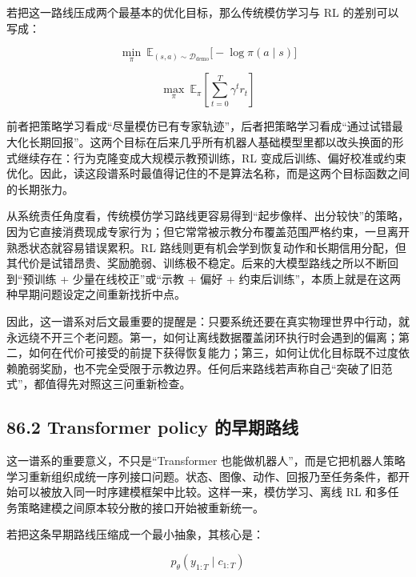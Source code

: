 若把这一路线压成两个最基本的优化目标，那么传统模仿学习与 RL 的差别可以写成：

\begingroup
\footnotesize
\begin{equation*}
\min_{\pi}\ \mathbb{E}_{(s,a)\sim \mathcal{D}_{\text{demo}}}\big[-\log \pi(a\mid s)\big]
\end{equation*}
\endgroup

\begingroup
\footnotesize
\begin{equation*}
\max_{\pi}\ \mathbb{E}_{\pi}\!\left[\sum_{t=0}^{T}\gamma^t r_t\right]
\end{equation*}
\endgroup

前者把策略学习看成“尽量模仿已有专家轨迹”，后者把策略学习看成“通过试错最大化长期回报”。这两个目标在后来几乎所有机器人基础模型里都以改头换面的形式继续存在：行为克隆变成大规模示教预训练，RL 变成后训练、偏好校准或约束优化。因此，读这段谱系时最值得记住的不是算法名称，而是这两个目标函数之间的长期张力。

从系统责任角度看，传统模仿学习路线更容易得到“起步像样、出分较快”的策略，因为它直接消费现成专家行为；但它常常被示教分布覆盖范围严格约束，一旦离开熟悉状态就容易错误累积。RL 路线则更有机会学到恢复动作和长期信用分配，但其代价是试错昂贵、奖励脆弱、训练极不稳定。后来的大模型路线之所以不断回到“预训练 + 少量在线校正”或“示教 + 偏好 + 约束后训练”，本质上就是在这两种早期问题设定之间重新找折中点。

因此，这一谱系对后文最重要的提醒是：只要系统还要在真实物理世界中行动，就永远绕不开三个老问题。第一，如何让离线数据覆盖闭环执行时会遇到的偏离；第二，如何在代价可接受的前提下获得恢复能力；第三，如何让优化目标既不过度依赖脆弱奖励，也不完全受限于示教边界。任何后来路线若声称自己“突破了旧范式”，都值得先对照这三问重新检查。

\subsection*{86.2 Transformer policy 的早期路线}


这一谱系的重要意义，不只是“Transformer 也能做机器人”，而是它把机器人策略学习重新组织成统一序列接口问题。状态、图像、动作、回报乃至任务条件，都开始可以被放入同一时序建模框架中比较。这样一来，模仿学习、离线 RL 和多任务策略建模之间原本较分散的接口开始被重新统一。

若把这条早期路线压缩成一个最小抽象，其核心是：

\begin{equation*}
p_\theta(y_{1:T}\mid c_{1:T})
\end{equation*}

